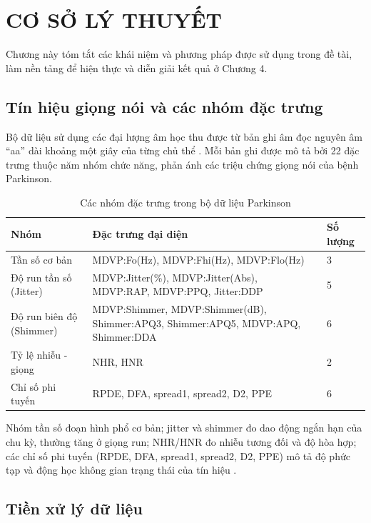 \chapter{CƠ SỞ LÝ THUYẾT}
\label{chap:theory}

Chương này tóm tắt các khái niệm và phương pháp được sử dụng trong đề tài, làm nền tảng để
hiện thực và diễn giải kết quả ở Chương 4.

\section{Tín hiệu giọng nói và các nhóm đặc trưng}

Bộ dữ liệu sử dụng các đại lượng âm học thu được từ bản ghi âm đọc nguyên âm ``aa'' dài
khoảng một giây của từng chủ thể \cite{little2009}. Mỗi bản ghi được mô tả bởi 22 đặc
trưng thuộc năm nhóm chức năng, phản ánh các triệu chứng giọng nói của bệnh Parkinson.

\begin{table}[H]
\centering
\caption{Các nhóm đặc trưng trong bộ dữ liệu Parkinson}
\begin{tabular}{|l|>{\raggedright\arraybackslash}p{7.4cm}|l|}
\hline
\textbf{Nhóm} & \textbf{Đặc trưng đại diện} & \textbf{Số lượng} \\
\hline
Tần số cơ bản & MDVP:Fo(Hz), MDVP:Fhi(Hz), MDVP:Flo(Hz) & 3 \\
\hline
Độ run tần số (Jitter) & MDVP:Jitter(\%), MDVP:Jitter(Abs), MDVP:RAP, MDVP:PPQ, Jitter:DDP & 5 \\
\hline
Độ run biên độ (Shimmer) & MDVP:Shimmer, MDVP:Shimmer(dB), Shimmer:APQ3, Shimmer:APQ5, MDVP:APQ, Shimmer:DDA & 6 \\
\hline
Tỷ lệ nhiễu - giọng & NHR, HNR & 2 \\
\hline
Chỉ số phi tuyến & RPDE, DFA, spread1, spread2, D2, PPE & 6 \\
\hline
\end{tabular}
\end{table}

Nhóm tần số đoạn hình phổ cơ bản; jitter và shimmer đo dao động ngắn hạn của chu kỳ, thường
tăng ở giọng run; NHR/HNR đo nhiễu tương đối và độ hòa hợp; các chỉ số phi tuyến (RPDE, DFA,
spread1, spread2, D2, PPE) mô tả độ phức tạp và động học không gian trạng thái của tín hiệu
\cite{little2009,han2011}.

\section{Tiền xử lý dữ liệu}

